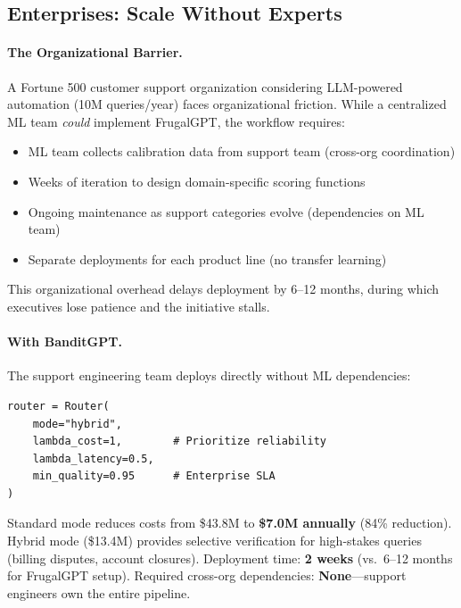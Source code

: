 \subsection{Enterprises: Scale Without Experts}

\paragraph{The Organizational Barrier.} A Fortune 500 customer support organization considering LLM-powered automation (10M queries/year) faces organizational friction. While a centralized ML team \emph{could} implement FrugalGPT, the workflow requires:
\begin{itemize}[leftmargin=*,nosep]
    \item ML team collects calibration data from support team (cross-org coordination)
    \item Weeks of iteration to design domain-specific scoring functions
    \item Ongoing maintenance as support categories evolve (dependencies on ML team)
    \item Separate deployments for each product line (no transfer learning)
\end{itemize}

This organizational overhead delays deployment by 6--12 months, during which executives lose patience and the initiative stalls.

\paragraph{With BanditGPT.} The support engineering team deploys directly without ML dependencies:

\begin{small}
\begin{verbatim}
router = Router(
    mode="hybrid", 
    lambda_cost=1,        # Prioritize reliability
    lambda_latency=0.5,
    min_quality=0.95      # Enterprise SLA
)
\end{verbatim}
\end{small}

Standard mode reduces costs from \$43.8M to \textbf{\$7.0M annually} (84\% reduction). Hybrid mode (\$13.4M) provides selective verification for high-stakes queries (billing disputes, account closures). Deployment time: \textbf{2 weeks} (vs.\ 6--12 months for FrugalGPT setup). Required cross-org dependencies: \textbf{None}---support engineers own the entire pipeline.

